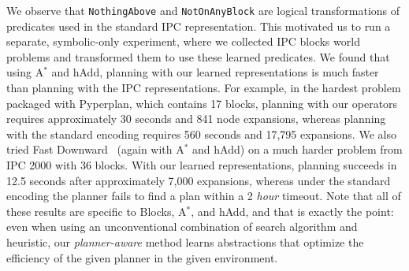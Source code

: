 We observe that \texttt{NothingAbove} and \texttt{NotOnAnyBlock} are logical transformations of predicates used in the standard IPC representation.
This motivated us to run a separate, symbolic-only experiment, where we collected IPC blocks world problems and transformed them to use these learned predicates.
We found that using A$^*$ and hAdd, planning with our learned representations is much faster than planning with the IPC representations.
For example, in the hardest problem packaged with Pyperplan, which contains 17 blocks, planning with our operators requires approximately 30 seconds and 841 node expansions, whereas planning with the standard encoding requires 560 seconds and 17,795 expansions.
We also tried Fast Downward~\cite{helmert2006fast} (again with A$^*$ and hAdd) on a much harder problem from IPC 2000 with 36 blocks.
With our learned representations, planning succeeds in 12.5 seconds after approximately 7,000 expansions, whereas under the standard encoding the planner fails to find a plan within a 2 \emph{hour} timeout.
Note that all of these results are specific to Blocks, A$^*$, and hAdd, and that is exactly the point: even when using an unconventional combination of search algorithm and heuristic, our \emph{planner-aware} method learns abstractions that optimize the efficiency of the given planner in the given environment.


